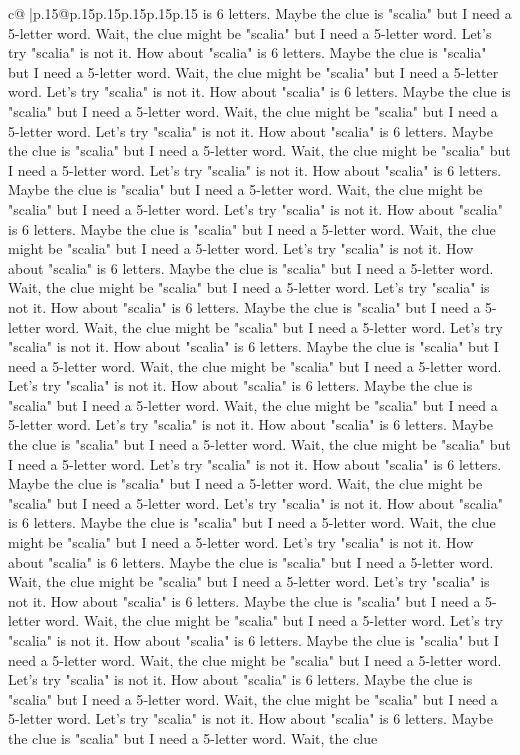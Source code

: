 \documentclass{article}
\begin{document}
{\begin{supertabular}{c@{$\;$}|p{.15\linewidth}@{}p{.15\linewidth}p{.15\linewidth}p{.15\linewidth}p{.15\linewidth}p{.15\linewidth}}
{{{is 6 letters. Maybe the clue is "scalia" but I need a 5{-}letter word. Wait, the clue might be "scalia" but I need a 5{-}letter word. Let's try "scalia" is not it. How about "scalia" is 6 letters. Maybe the clue is "scalia" but I need a 5{-}letter word. Wait, the clue might be "scalia" but I need a 5{-}letter word. Let's try "scalia" is not it. How about "scalia" is 6 letters. Maybe the clue is "scalia" but I need a 5{-}letter word. Wait, the clue might be "scalia" but I need a 5{-}letter word. Let's try "scalia" is not it. How about "scalia" is 6 letters. Maybe the clue is "scalia" but I need a 5{-}letter word. Wait, the clue might be "scalia" but I need a 5{-}letter word. Let's try "scalia" is not it. How about "scalia" is 6 letters. Maybe the clue is "scalia" but I need a 5{-}letter word. Wait, the clue might be "scalia" but I need a 5{-}letter word. Let's try "scalia" is not it. How about "scalia" is 6 letters. Maybe the clue is "scalia" but I need a 5{-}letter word. Wait, the clue might be "scalia" but I need a 5{-}letter word. Let's try "scalia" is not it. How about "scalia" is 6 letters. Maybe the clue is "scalia" but I need a 5{-}letter word. Wait, the clue might be "scalia" but I need a 5{-}letter word. Let's try "scalia" is not it. How about "scalia" is 6 letters. Maybe the clue is "scalia" but I need a 5{-}letter word. Wait, the clue might be "scalia" but I need a 5{-}letter word. Let's try "scalia" is not it. How about "scalia" is 6 letters. Maybe the clue is "scalia" but I need a 5{-}letter word. Wait, the clue might be "scalia" but I need a 5{-}letter word. Let's try "scalia" is not it. How about "scalia" is 6 letters. Maybe the clue is "scalia" but I need a 5{-}letter word. Wait, the clue might be "scalia" but I need a 5{-}letter word. Let's try "scalia" is not it. How about "scalia" is 6 letters. Maybe the clue is "scalia" but I need a 5{-}letter word. Wait, the clue might be "scalia" but I need a 5{-}letter word. Let's try "scalia" is not it. How about "scalia" is 6 letters. Maybe the clue is "scalia" but I need a 5{-}letter word. Wait, the clue might be "scalia" but I need a 5{-}letter word. Let's try "scalia" is not it. How about "scalia" is 6 letters. Maybe the clue is "scalia" but I need a 5{-}letter word. Wait, the clue might be "scalia" but I need a 5{-}letter word. Let's try "scalia" is not it. How about "scalia" is 6 letters. Maybe the clue is "scalia" but I need a 5{-}letter word. Wait, the clue might be "scalia" but I need a 5{-}letter word. Let's try "scalia" is not it. How about "scalia" is 6 letters. Maybe the clue is "scalia" but I need a 5{-}letter word. Wait, the clue might be "scalia" but I need a 5{-}letter word. Let's try "scalia" is not it. How about "scalia" is 6 letters. Maybe the clue is "scalia" but I need a 5{-}letter word. Wait, the clue might be "scalia" but I need a 5{-}letter word. Let's try "scalia" is not it. How about "scalia" is 6 letters. Maybe the clue is "scalia" but I need a 5{-}letter word. Wait, the clue might be "scalia" but I need a 5{-}letter word. Let's try "scalia" is not it. How about "scalia" is 6 letters. Maybe the clue is "scalia" but I need a 5{-}letter word. Wait, the clue }}}
\end{supertabular}}
\end{document}
